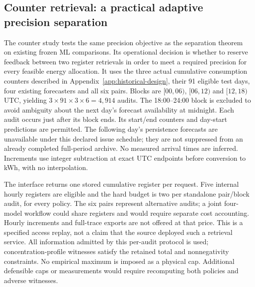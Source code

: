 \subsection{Counter retrieval: a practical adaptive precision separation}
\label{sec:counter-precision-results}
The counter study tests the same precision objective as the separation
theorem on existing frozen ML comparisons. Its operational decision is
whether to reserve feedback between two register retrievals in order to
meet a required precision for every feasible energy allocation.
It uses the three actual cumulative consumption counters described in
Appendix~\ref{app:historical-design}, their 91 eligible test days, four
existing forecasters and all six pairs. Blocks are $[00,06)$, $[06,12)$
and $[12,18)$ UTC, yielding $3\times91\times3\times6=4,914$ audits.
The 18:00--24:00 block is excluded to avoid ambiguity about the next
day's forecast availability at midnight. Each audit occurs just after its block ends. Its start/end counters and
day-start predictions are permitted. The following day's persistence
forecasts are unavailable under this declared issue schedule; they are
not suppressed from an already completed full-period archive. No measured
arrival times are inferred. Increments use integer subtraction at exact
UTC endpoints before conversion to kWh, with no interpolation.

The interface returns one stored cumulative register per request. Five
internal hourly registers are eligible and the hard budget is two per
standalone pair/block audit, for every policy. The six pairs represent
alternative audits; a joint four-model workflow could share registers and
would require separate cost accounting. Hourly increments and full-trace exports are
not offered at that price. This is a specified access replay, not a claim
that the source deployed such a retrieval service. All information admitted
by this per-audit protocol is used; concentration-profile witnesses satisfy the retained
total and nonnegativity constraints. No empirical maximum is imposed as a
physical cap. Additional defensible caps or measurements would require
recomputing both policies and adverse witnesses.

